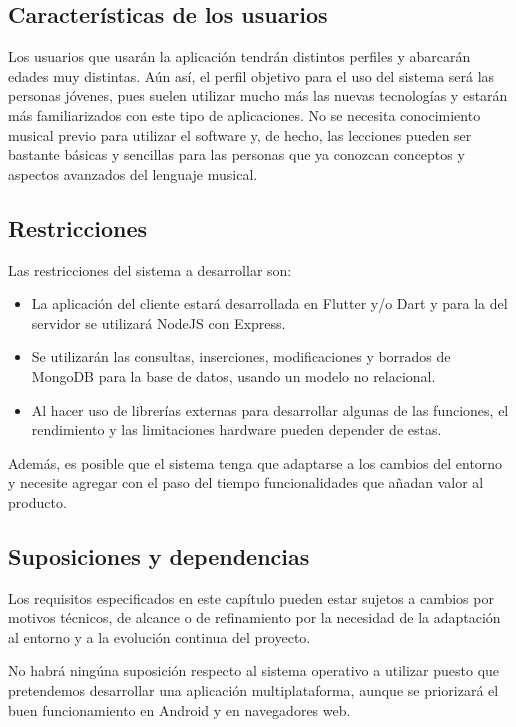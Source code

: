 \subsection{Características de los usuarios}
Los usuarios que usarán la aplicación tendrán distintos perfiles y abarcarán edades muy distintas. Aún así,
el perfil objetivo para el uso del sistema será las personas jóvenes, pues suelen utilizar mucho más las nuevas tecnologías
y estarán más familiarizados con este tipo de aplicaciones. No se necesita conocimiento musical previo para utilizar el software y,
de hecho, las lecciones pueden ser bastante básicas y sencillas para las personas que ya conozcan conceptos y aspectos avanzados del lenguaje musical.


\subsection{Restricciones}

Las restricciones del sistema a desarrollar son:
\begin{itemize}
    \item La aplicación del cliente estará desarrollada en Flutter y/o Dart y para la del servidor se utilizará NodeJS con Express.
    \item Se utilizarán las consultas, inserciones, modificaciones y borrados de MongoDB para la base de datos, usando un modelo no relacional.
    \item Al hacer uso de librerías externas para desarrollar algunas de las funciones, el rendimiento y las limitaciones hardware pueden depender de estas.
\end{itemize}


Además, es posible que el sistema tenga que adaptarse a los cambios del entorno y necesite agregar con el paso del tiempo funcionalidades que añadan valor
al producto.


\subsection{Suposiciones y dependencias}
Los requisitos especificados en este capítulo pueden estar sujetos a cambios por motivos técnicos, de alcance o de refinamiento por la necesidad de la adaptación
al entorno y a la evolución continua del proyecto.

No habrá ningúna suposición respecto al sistema operativo a utilizar puesto que pretendemos desarrollar una aplicación multiplataforma, aunque se priorizará el buen funcionamiento en Android y en navegadores web.

